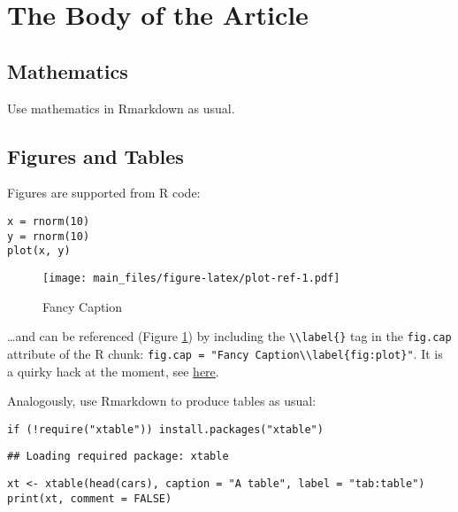 \documentclass[AMA,STIX1COL,]{WileyNJD-v2}
\begin{document}
\hypertarget{the-body-of-the-article}{%
\section{The Body of the Article}\label{the-body-of-the-article}}

\hypertarget{mathematics}{%
\subsection{Mathematics}\label{mathematics}}

Use mathematics in Rmarkdown as usual.

\hypertarget{figures-and-tables}{%
\subsection{Figures and Tables}\label{figures-and-tables}}

Figures are supported from R code:

\begin{verbatim}
x = rnorm(10)
y = rnorm(10)
plot(x, y)
\end{verbatim}

\begin{figure}
\centering
\texttt{[image: main\_files/figure-latex/plot-ref-1.pdf]}
\caption{Fancy Caption\label{fig:plot}}
\end{figure}

\ldots and can be referenced (Figure \ref{fig:plot}) by including the
\texttt{\textbackslash{}\textbackslash{}label\{\}} tag in the
\texttt{fig.cap} attribute of the R chunk:
\texttt{fig.cap\ =\ "Fancy\ Caption\textbackslash{}\textbackslash{}label\{fig:plot\}"}.
It is a quirky hack at the moment, see
\href{https://github.com/yihui/knitr/issues/323}{here}.

Analogously, use Rmarkdown to produce tables as usual:

\begin{verbatim}
if (!require("xtable")) install.packages("xtable")
\end{verbatim}

\begin{verbatim}
## Loading required package: xtable
\end{verbatim}

\begin{verbatim}
xt <- xtable(head(cars), caption = "A table", label = "tab:table")
print(xt, comment = FALSE)
\end{verbatim}
\end{document}
